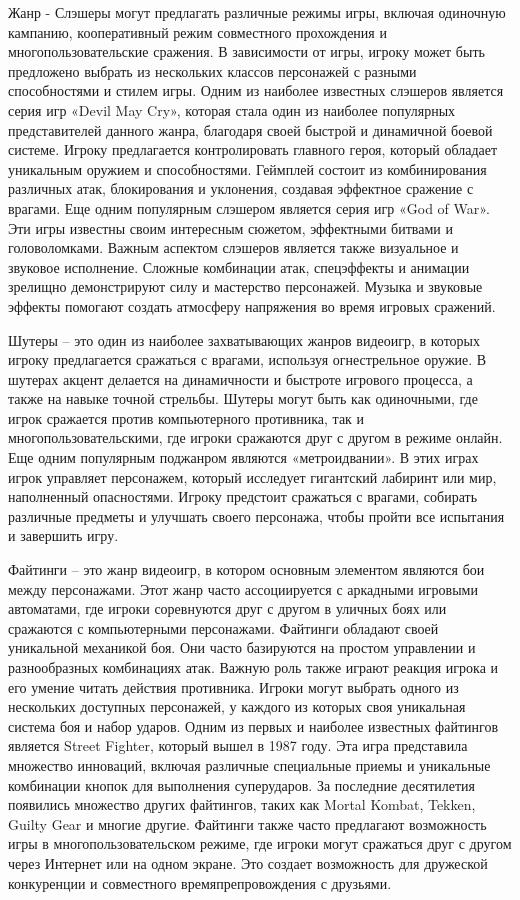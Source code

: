 Жанр - Слэшеры могут предлагать различные режимы игры, включая одиночную кампанию, кооперативный режим совместного прохождения и многопользовательские сражения. В зависимости от игры, игроку может быть предложено выбрать из нескольких классов персонажей с разными способностями и стилем игры. Одним из наиболее известных слэшеров является серия игр «Devil May Cry», которая стала один из наиболее популярных представителей данного жанра, благодаря своей быстрой и динамичной боевой системе. Игроку предлагается контролировать главного героя, который обладает уникальным оружием и способностями. Геймплей состоит из комбинирования различных атак, блокирования и уклонения, создавая эффектное сражение с врагами. Еще одним популярным слэшером является серия игр «God of War». Эти игры известны своим интересным сюжетом, эффектными битвами и головоломками. Важным аспектом слэшеров является также визуальное и звуковое исполнение. Сложные комбинации атак, спецэффекты и анимации зрелищно демонстрируют силу и мастерство персонажей. Музыка и звуковые эффекты помогают создать атмосферу напряжения во время игровых сражений.

Шутеры – это один из наиболее захватывающих жанров видеоигр, в которых игроку предлагается сражаться с врагами, используя огнестрельное оружие. В шутерах акцент делается на динамичности и быстроте игрового процесса, а также на навыке точной стрельбы. Шутеры могут быть как одиночными, где игрок сражается против компьютерного противника, так и многопользовательскими, где игроки сражаются друг с другом в режиме онлайн. Еще одним популярным поджанром являются «метроидвании». В этих играх игрок управляет персонажем, который исследует гигантский лабиринт или мир, наполненный опасностями. Игроку предстоит сражаться с врагами, собирать различные предметы и улучшать своего персонажа, чтобы пройти все испытания и завершить игру.

Файтинги – это жанр видеоигр, в котором основным элементом являются бои между персонажами. Этот жанр часто ассоциируется с аркадными игровыми автоматами, где игроки соревнуются друг с другом в уличных боях или сражаются с компьютерными персонажами.
Файтинги обладают своей уникальной механикой боя. Они часто базируются на простом управлении и разнообразных комбинациях атак. Важную роль также играют реакция игрока и его умение читать действия противника. Игроки могут выбрать одного из нескольких доступных персонажей, у каждого из которых своя уникальная система боя и набор ударов.
Одним из первых и наиболее известных файтингов является Street Fighter, который вышел в 1987 году. Эта игра представила множество инноваций, включая различные специальные приемы и уникальные комбинации кнопок для выполнения суперударов. За последние десятилетия появились множество других файтингов, таких как Mortal Kombat, Tekken, Guilty Gear и многие другие.
Файтинги также часто предлагают возможность игры в многопользовательском режиме, где игроки могут сражаться друг с другом через Интернет или на одном экране. Это создает возможность для дружеской конкуренции и совместного времяпрепровождения с друзьями.\newline



